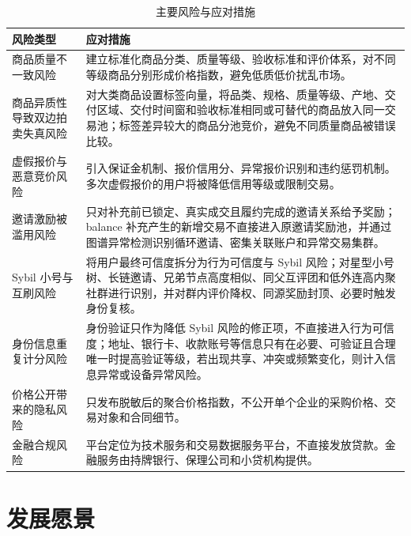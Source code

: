 \documentclass[UTF8,11pt]{ctexart}
\begin{document}
\begin{table}[h]
    \centering
    \caption{主要风险与应对措施}
    \begin{tabularx}{\textwidth}{p{3.5cm}Y}
        \toprule
        风险类型            & 应对措施                                                                                                \\
        \midrule
        商品质量不一致风险       & 建立标准化商品分类、质量等级、验收标准和评价体系，对不同等级商品分别形成价格指数，避免低质低价扰乱市场。                                                \\
        商品异质性导致双边拍卖失真风险 & 对大类商品设置标签向量，将品类、规格、质量等级、产地、交付区域、交付时间窗和验收标准相同或可替代的商品放入同一交易池；标签差异较大的商品分池竞价，避免不同质量商品被错误比较。             \\
        虚假报价与恶意竞价风险     & 引入保证金机制、报价信用分、异常报价识别和违约惩罚机制。多次虚假报价的用户将被降低信用等级或限制交易。                                                 \\
        邀请激励被滥用风险       & 只对补充前已锁定、真实成交且履约完成的邀请关系给予奖励；balance 补充产生的新增交易不直接进入原邀请奖励池，并通过图谱异常检测识别循环邀请、密集关联账户和异常交易集群。             \\
        Sybil 小号与互刷风险   & 将用户最终可信度拆分为行为可信度与 Sybil 风险；对星型小号树、长链邀请、兄弟节点高度相似、同父互评团和低外连高内聚社群进行识别，并对群内评价降权、同源奖励封顶、必要时触发身份复核。       \\
        身份信息重复计分风险      & 身份验证只作为降低 Sybil 风险的修正项，不直接进入行为可信度；地址、银行卡、收款账号等信息只有在必要、可验证且合理唯一时提高验证等级，若出现共享、冲突或频繁变化，则计入信息异常或设备异常风险。 \\
        价格公开带来的隐私风险     & 只发布脱敏后的聚合价格指数，不公开单个企业的采购价格、交易对象和合同细节。                                                               \\
        金融合规风险          & 平台定位为技术服务和交易数据服务平台，不直接发放贷款。金融服务由持牌银行、保理公司和小贷机构提供。                                                   \\
        \bottomrule
    \end{tabularx}
\end{table}

\section{发展愿景}
\end{document}
